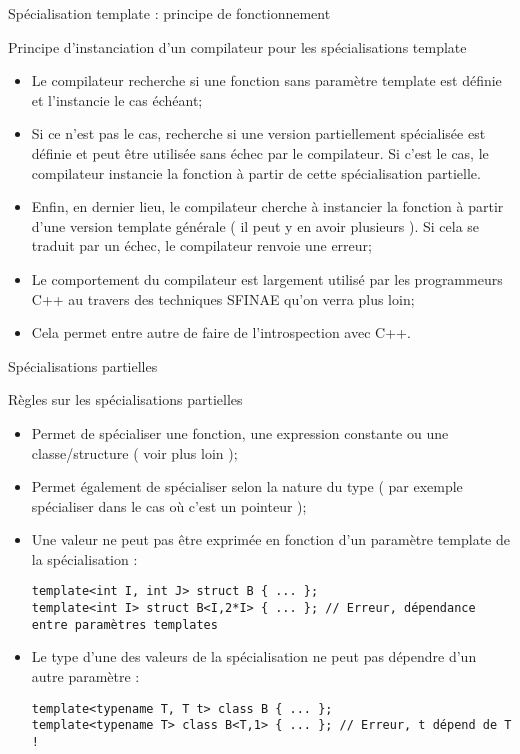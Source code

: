\documentclass[handout,10pt]{beamer}
\begin{document}
\begin{frame}[fragile]{Spécialisation template : principe de fonctionnement}
\tiny
\begin{block}{Principe d'instanciation d'un compilateur pour les spécialisations template}
\begin{itemize}
\item Le compilateur recherche si une fonction sans paramètre template est définie et l'instancie le cas échéant;
\item Si ce n'est pas le cas, recherche si une version partiellement spécialisée est définie et  peut être utilisée sans échec
par le compilateur. Si c'est le cas, le compilateur instancie la fonction à partir de cette spécialisation partielle.
\item Enfin, en dernier lieu, le compilateur cherche à instancier la fonction à partir d'une version template générale ( il peut
y en avoir plusieurs ). Si cela se traduit par un échec, le compilateur renvoie une erreur;
\item Le comportement du compilateur est largement utilisé par les programmeurs C++ au travers des techniques SFINAE qu'on verra plus loin;
\item Cela permet entre autre de faire de l'introspection avec C++.
\end{itemize}
\end{block}
\end{frame}

\begin{frame}[fragile]{Spécialisations partielles}
\begin{block}{Règles sur les spécialisations partielles}
\begin{itemize}
\item Permet de spécialiser une fonction, une expression constante ou une classe/structure ( voir plus loin );
\item Permet également de spécialiser selon la nature du type ( par exemple spécialiser dans le cas où c'est un pointeur );
\item Une valeur ne peut pas être exprimée en fonction d'un paramètre template de la spécialisation :
\begin{lstlisting}
template<int I, int J> struct B { ... };
template<int I> struct B<I,2*I> { ... }; // Erreur, dépendance entre paramètres templates
\end{lstlisting}
\item Le type d'une des valeurs de la spécialisation ne peut pas dépendre d'un autre paramètre :
\begin{lstlisting}
template<typename T, T t> class B { ... };
template<typename T> class B<T,1> { ... }; // Erreur, t dépend de T !
\end{lstlisting}
\end{itemize}
\end{block}
\end{frame}
\end{document}
